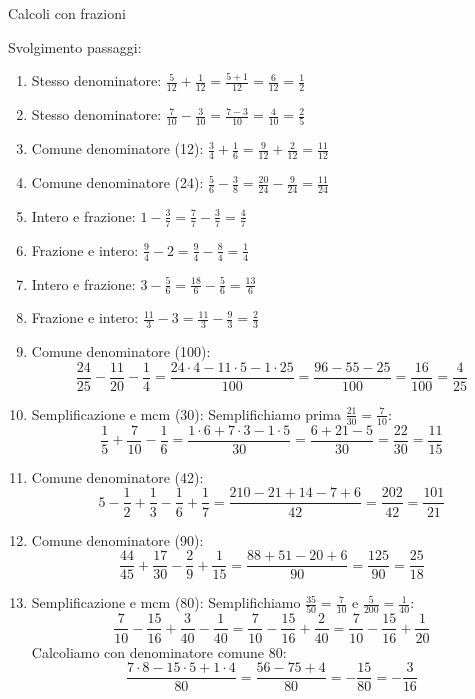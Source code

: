 \begin{esercizio}{Calcoli con frazioni}
\begin{soluzione}
  Svolgimento passaggi:
  \begin{enumerate}[label=\alph*)]
    \item Stesso denominatore: $\frac{5}{12} + \frac{1}{12} = \frac{5+1}{12} = \frac{6}{12} = \frac{1}{2}$
    \item Stesso denominatore: $\frac{7}{10} - \frac{3}{10} = \frac{7-3}{10} = \frac{4}{10} = \frac{2}{5}$
    \item Comune denominatore (12): $\frac{3}{4} + \frac{1}{6} = \frac{9}{12} + \frac{2}{12} = \frac{11}{12}$
    \item Comune denominatore (24): $\frac{5}{6} - \frac{3}{8} = \frac{20}{24} - \frac{9}{24} = \frac{11}{24}$
    \item Intero e frazione: $1 - \frac{3}{7} = \frac{7}{7} - \frac{3}{7} = \frac{4}{7}$
    \item Frazione e intero: $\frac{9}{4} - 2 = \frac{9}{4} - \frac{8}{4} = \frac{1}{4}$
    \item Intero e frazione: $3 - \frac{5}{6} = \frac{18}{6} - \frac{5}{6} = \frac{13}{6}$
    \item Frazione e intero: $\frac{11}{3} - 3 = \frac{11}{3} - \frac{9}{3} = \frac{2}{3}$
    \item Comune denominatore (100):
      \[
      \frac{24}{25} - \frac{11}{20} - \frac{1}{4} = \frac{24 \cdot 4 - 11 \cdot 5 - 1 \cdot 25}{100} = \frac{96 - 55 - 25}{100} = \frac{16}{100} = \frac{4}{25}
      \]
    \item Semplificazione e mcm (30): Semplifichiamo prima $\frac{21}{30} = \frac{7}{10}$:
      \[
      \frac{1}{5} + \frac{7}{10} - \frac{1}{6} = \frac{1 \cdot 6 + 7 \cdot 3 - 1 \cdot 5}{30} = \frac{6 + 21 - 5}{30} = \frac{22}{30} = \frac{11}{15}
      \]
    \item Comune denominatore (42):
      \[
      5 - \frac{1}{2} + \frac{1}{3} - \frac{1}{6} + \frac{1}{7} = \frac{210 - 21 + 14 - 7 + 6}{42} = \frac{202}{42} = \frac{101}{21}
      \]
    \item Comune denominatore (90):
      \[
      \frac{44}{45} + \frac{17}{30} - \frac{2}{9} + \frac{1}{15} = \frac{88 + 51 - 20 + 6}{90} = \frac{125}{90} = \frac{25}{18}
      \]
    \item Semplificazione e mcm (80): Semplifichiamo $\frac{35}{50} = \frac{7}{10}$ e $\frac{5}{200} = \frac{1}{40}$:
      \[
      \frac{7}{10} - \frac{15}{16} + \frac{3}{40} - \frac{1}{40} = \frac{7}{10} - \frac{15}{16} + \frac{2}{40} = \frac{7}{10} - \frac{15}{16} + \frac{1}{20}
      \]
      Calcoliamo con denominatore comune 80:
      \[
      \frac{7 \cdot 8 - 15 \cdot 5 + 1 \cdot 4}{80} = \frac{56 - 75 + 4}{80} = -\frac{15}{80} = -\frac{3}{16}
      \]
  \end{enumerate}
\end{soluzione}
\end{esercizio}

